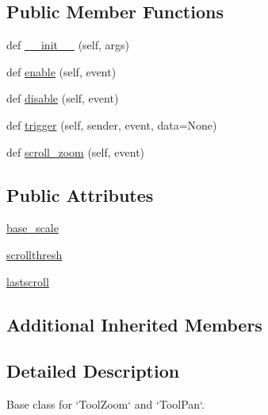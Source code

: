 \subsection*{Public Member Functions}
\begin{DoxyCompactItemize}
\item 
def \hyperlink{classmatplotlib_1_1backend__tools_1_1ZoomPanBase_a11eeff93d8828f5e1986c632551c4c53}{\+\_\+\+\_\+init\+\_\+\+\_\+} (self, args)
\item 
def \hyperlink{classmatplotlib_1_1backend__tools_1_1ZoomPanBase_a160f164dc7ec262f34f5dacae6e1dcc9}{enable} (self, event)
\item 
def \hyperlink{classmatplotlib_1_1backend__tools_1_1ZoomPanBase_aa8f28c84dd0c71845a858aabb4869a13}{disable} (self, event)
\item 
def \hyperlink{classmatplotlib_1_1backend__tools_1_1ZoomPanBase_a66a419c17ec3c1956bbf852d6142fc96}{trigger} (self, sender, event, data=None)
\item 
def \hyperlink{classmatplotlib_1_1backend__tools_1_1ZoomPanBase_a7606a151c3445ddaf9324970d3f101c9}{scroll\+\_\+zoom} (self, event)
\end{DoxyCompactItemize}
\subsection*{Public Attributes}
\begin{DoxyCompactItemize}
\item 
\hyperlink{classmatplotlib_1_1backend__tools_1_1ZoomPanBase_a1d186f2b7cdd7bee716c5305fd05b387}{base\+\_\+scale}
\item 
\hyperlink{classmatplotlib_1_1backend__tools_1_1ZoomPanBase_acefd868658c8371a307422acf841f741}{scrollthresh}
\item 
\hyperlink{classmatplotlib_1_1backend__tools_1_1ZoomPanBase_a5cfed4646a87f71827a8996d393ad13c}{lastscroll}
\end{DoxyCompactItemize}
\subsection*{Additional Inherited Members}


\subsection{Detailed Description}
\begin{DoxyVerb}Base class for `ToolZoom` and `ToolPan`.\end{DoxyVerb}
 

